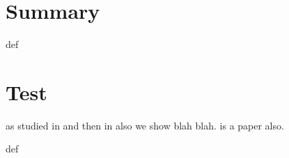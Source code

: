 \documentclass[a4paper,12pt]{article} %
\providecommand{\phantomsection}{def} %
\begin{document}

\newpage
\thispagestyle{empty}
\section*{Summary}
\phantomsection %


\newpage
\thispagestyle{empty}
\printglossary[type=acronym, title={Abbreviations}]




	






\newpage
\section{Test}

as studied in \parencite{Anastasina2014, Feng2012} and then in also \cite{Feng2012} we show blah blah. \cite{Kainov2011a} is a paper also.

\newpage
\phantomsection %
\printbibliography[heading=bibintoc] %
\end{document}

